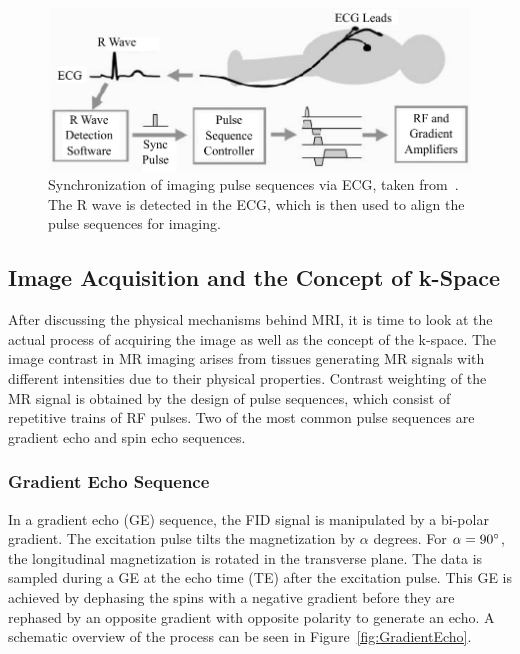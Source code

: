 \begin{figure}[h] %
	\centering
	\includegraphics[width=\linewidth]{./Images/CineWorkFlow.pdf} 
	\caption{Synchronization of imaging pulse sequences via ECG, taken from~\cite{CineReview1}. The R wave is detected in the ECG, which is then used to align the pulse sequences for imaging.}
	\label{fig:CineWorkFlow}
\end{figure}

\subsection{Image Acquisition and the Concept of k-Space} \label{SubSec:ImageAcquisitionAndK-Space}
After discussing the physical mechanisms behind MRI, it is time to look at the actual process of acquiring the image as well as the concept of the k-space. The image contrast in MR imaging arises from tissues generating MR signals with different intensities due to their physical properties. Contrast weighting of the MR signal is obtained by the design of pulse sequences, which consist of repetitive trains of RF pulses. Two of the most common pulse sequences are gradient echo and spin echo sequences. 

\subsubsection{Gradient Echo Sequence}
In a gradient echo (GE) sequence, the FID signal is manipulated by a bi-polar gradient. The excitation pulse tilts the magnetization by $\alpha$ degrees. For $\alpha = 90\degree$, the longitudinal magnetization is rotated in the transverse plane. The data is sampled during a GE at the echo time (TE) after the excitation pulse. This GE is achieved by dephasing the spins with a negative gradient before they are rephased by an opposite gradient with opposite polarity to generate an echo. A schematic overview of the process can be seen in Figure~\ref{fig:GradientEcho}. \\

